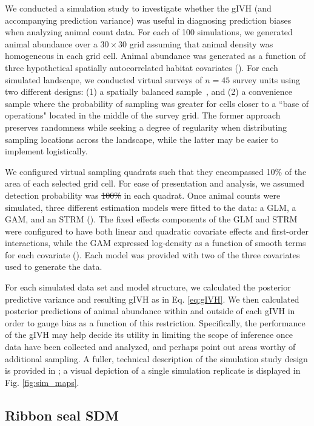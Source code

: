\documentclass[10pt,letterpaper]{article}
\providecommand{\DIFadd}[1]{{\protect\color{blue}\uwave{#1}}} %
\providecommand{\DIFdel}[1]{{\protect\color{red}\sout{#1}}}                      %
\providecommand{\DIFaddbegin}{} %
\providecommand{\DIFaddend}{} %
\providecommand{\DIFdelbegin}{} %
\providecommand{\DIFdelend}{} %
\begin{document}
We conducted a simulation study to investigate whether the gIVH (and accompanying prediction variance) was useful in diagnosing prediction biases when analyzing animal count data. For each of 100 simulations, we generated animal abundance over a $30 \times 30$ grid assuming that animal density was homogeneous in each grid cell.  Animal abundance was generated as a function of three hypothetical spatially autocorrelated habitat covariates ().   For each simulated landscape, we conducted virtual surveys of $n=45$ survey units using two different designs: (1) a spatially balanced sample~\cite{StevensOlsen2004}, and (2) a convenience sample where the probability of sampling was greater for cells closer to a ``base of operations" located in the middle of the survey grid. The former approach preserves randomness while seeking a degree of regularity when distributing sampling locations across the landscape, while the latter may be easier to implement logistically.

We configured virtual sampling quadrats such that they encompassed 10\% of the area of each selected grid cell.  For ease of presentation and analysis, we assumed detection probability was \DIFdelbegin \DIFdel{100\% }\DIFdelend \DIFaddbegin \DIFadd{1.0 }\DIFaddend in each quadrat.  Once animal counts were simulated, three different estimation models were fitted to the data: a GLM, a GAM, and an STRM ().  The fixed effects components of the GLM and STRM were configured to have both linear and quadratic covariate effects and first-order interactions, while the GAM expressed log-density as a function of smooth terms for each covariate ().  Each model was provided with two of the three covariates used to generate the data.

For each simulated data set and model structure, we calculated the posterior predictive variance and resulting gIVH as in Eq. \ref{eq:gIVH}. We then calculated posterior predictions of animal abundance within and outside of each gIVH in order to gauge bias as a function of this restriction.  Specifically, the performance of the gIVH may help decide its utility in limiting the scope of inference once data have been collected and analyzed, and perhaps point out areas worthy of additional sampling.  A fuller, technical description of the simulation study design is provided in ; a visual depiction of a single simulation replicate is displayed in
Fig. \ref{fig:sim_maps}.


\subsection*{Ribbon seal SDM}
\end{document}
